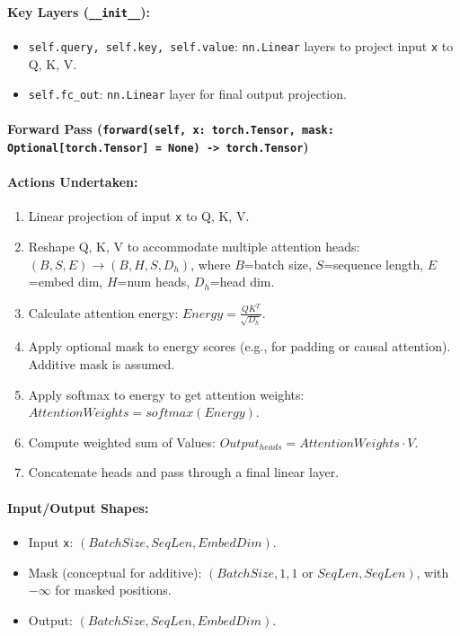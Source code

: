 \documentclass{article}
\begin{document}
\paragraph{Key Layers (\texttt{\_\_init\_\_}):}
\begin{itemize}
    \item \texttt{self.query, self.key, self.value}: \texttt{nn.Linear} layers to project input \texttt{x} to Q, K, V.
    \item \texttt{self.fc\_out}: \texttt{nn.Linear} layer for final output projection.
\end{itemize}
\paragraph{Forward Pass (\texttt{forward(self, x: torch.Tensor, mask: Optional[torch.Tensor] = None) -> torch.Tensor})}
\paragraph{Actions Undertaken:}
\begin{enumerate}
    \item Linear projection of input \texttt{x} to Q, K, V.
    \item Reshape Q, K, V to accommodate multiple attention heads: $(B, S, E) \rightarrow (B, H, S, D_h)$, where $B$=batch size, $S$=sequence length, $E$=embed dim, $H$=num heads, $D_h$=head dim.
    \item Calculate attention energy: $Energy = \frac{Q K^T}{\sqrt{D_h}}$.
    \item Apply optional mask to energy scores (e.g., for padding or causal attention). Additive mask is assumed.
    \item Apply softmax to energy to get attention weights: $AttentionWeights = softmax(Energy)$.
    \item Compute weighted sum of Values: $Output_{heads} = AttentionWeights \cdot V$.
    \item Concatenate heads and pass through a final linear layer.
\end{enumerate}
\paragraph{Input/Output Shapes:}
\begin{itemize}
    \item Input \texttt{x}: $(BatchSize, SeqLen, EmbedDim)$.
    \item Mask (conceptual for additive): $(BatchSize, 1, 1 \text{ or } SeqLen, SeqLen)$, with $-\infty$ for masked positions.
    \item Output: $(BatchSize, SeqLen, EmbedDim)$.
\end{itemize}
\end{document}
